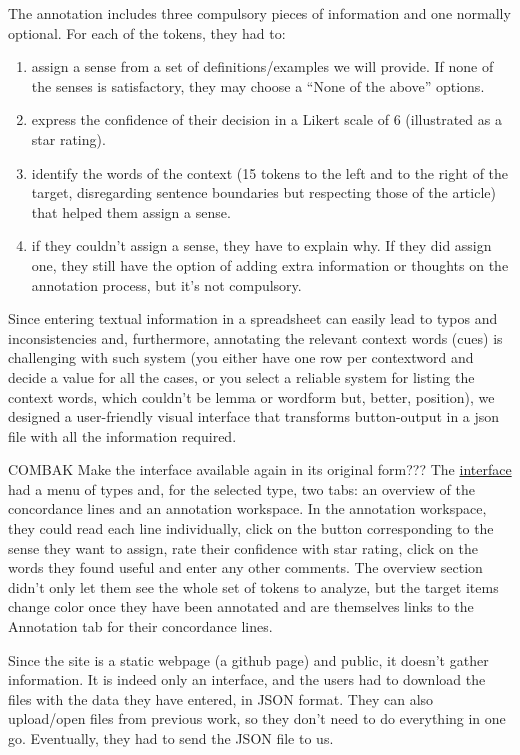 \documentclass[
]{book}
\providecommand{\tightlist}{%
  \setlength{\itemsep}{0pt}\setlength{\parskip}{0pt}}
\begin{document}
The annotation includes three compulsory pieces of information and one normally optional. For each of the tokens, they had to:

\begin{enumerate}
\def\labelenumi{\arabic{enumi}.}
\tightlist
\item
  assign a sense from a set of definitions/examples we will provide. If none of the senses is satisfactory, they may choose a ``None of the above'' options.
\item
  express the confidence of their decision in a Likert scale of 6 (illustrated as a star rating).
\item
  identify the words of the context (15 tokens to the left and to the right of the target, disregarding sentence boundaries but respecting those of the article) that helped them assign a sense.
\item
  if they couldn't assign a sense, they have to explain why. If they did assign one, they still have the option of adding extra information or thoughts on the annotation process, but it's not compulsory.
\end{enumerate}

Since entering textual information in a spreadsheet can easily lead to typos and inconsistencies and, furthermore, annotating the relevant context words (cues) is challenging with such system (you either have one row per contextword and decide a value for all the cases, or you select a reliable system for listing the context words, which couldn't be lemma or wordform but, better, position), we designed a user-friendly visual interface that transforms button-output in a json file with all the information required.

COMBAK Make the interface available again in its original form???
The \href{http://montesmariana.github.io/Annotation/}{interface} had a menu of types and, for the selected type, two tabs: an overview of the concordance lines and an annotation workspace. In the annotation workspace, they could read each line individually, click on the button corresponding to the sense they want to assign, rate their confidence with star rating, click on the words they found useful and enter any other comments. The overview section didn't only let them see the whole set of tokens to analyze, but the target items change color once they have been annotated and are themselves links to the Annotation tab for their concordance lines.

Since the site is a static webpage (a github page) and public, it doesn't gather information. It is indeed only an interface, and the users had to download the files with the data they have entered, in JSON format. They can also upload/open files from previous work, so they don't need to do everything in one go. Eventually, they had to send the JSON file to us.
\end{document}
